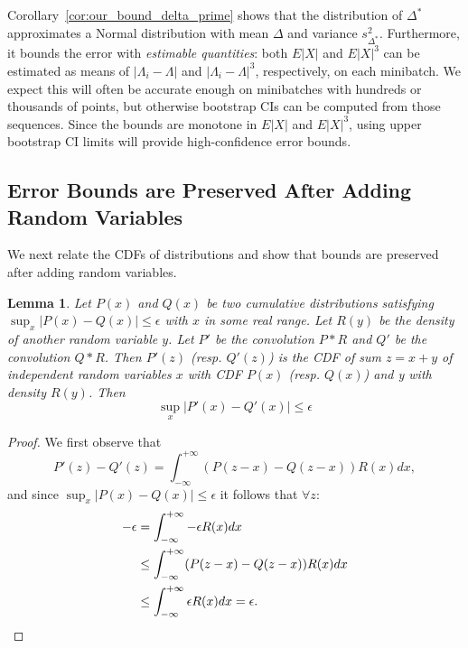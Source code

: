 \documentclass[twoside]{article} \usepackage{aistats2017}
\newtheorem{lemma}{Lemma}
\begin{document}
Corollary~\ref{cor:our_bound_delta_prime} shows that the distribution of
$\Delta^*$ approximates a Normal distribution with mean $\Delta$ and variance
$s^2_{\Delta^*}$. Furthermore, it bounds the error with \emph{estimable
quantities}: both $E|X|$ and $E|X|^3$ can be estimated as means of $|\Lambda_i
- \Lambda|$ and $|\Lambda_i - \Lambda|^3$, respectively, on each minibatch. We
expect this will often be accurate enough on minibatches with hundreds or
thousands of points, but otherwise bootstrap CIs can be computed from those
sequences. Since the bounds are monotone in $E|X|$ and $E|X|^3$, using upper
bootstrap CI limits will provide high-confidence error bounds.



\subsection{Error Bounds are Preserved After Adding Random Variables}\label{ssec:preserve_bounds}

We next relate the CDFs of distributions and show that bounds are preserved
after adding random variables.

\begin{lemma}\label{lem:cdf_bounds}
Let $P(x)$ and $Q(x)$ be two cumulative distributions satisfying
$\sup_x|P(x)-Q(x)|\leq \epsilon$ with $x$ in some real range. Let $R(y)$ be the
{\em density} of another random variable $y$. Let $P'$ be the convolution $P*R$
and $Q'$ be the convolution $Q*R$. Then $P'(z)$ (resp. $Q'(z)$) is the CDF of
sum $z=x+y$ of independent random variables $x$ with CDF $P(x)$ (resp. $Q(x)$)
and y with density $R(y)$.  Then
\begin{equation}
    \sup_x|P'(x)-Q'(x)|\leq \epsilon
\end{equation}
\end{lemma}

\begin{proof}
We first observe that
\begin{equation}\label{eq:pdf_difference}
    P'(z) - Q'(z) = \int_{-\infty}^{+\infty}(P(z-x)-Q(z-x))R(x) dx,
\end{equation}
and since $\sup_x|P(x)-Q(x)|\leq \epsilon$ it follows that $\forall z$:
\begin{equation}
\begin{split}
-\epsilon &= \tiny{\int_{-\infty}^{+\infty} -\epsilon R(x) dx } \\
&\leq \int_{-\infty}^{+\infty}(P(z-x)-Q(z-x))R(x) dx \\
&\leq \int_{-\infty}^{+\infty}\epsilon R(x) dx = \epsilon.
\end{split}
\end{equation}
\end{proof}
\vspace{-10pt}
\end{document}
